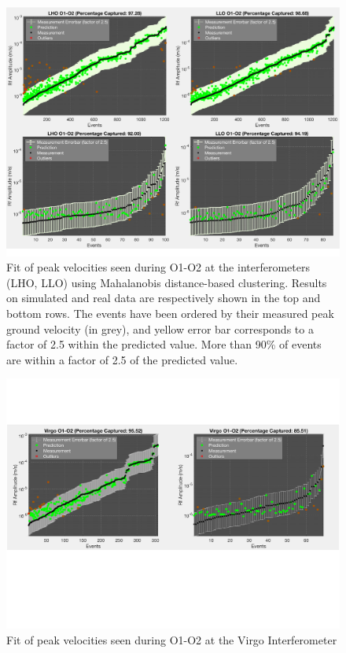 \documentclass[reprint, prl, aps, showpacs]{revtex4-1}
\begin{document}
\begin{figure}[!htb]
\hspace*{-0.5cm}
 \includegraphics[width=\textwidth]{./plots/ClusteringPrediction.pdf}
 \caption{Fit of peak velocities seen during O1-O2 at the interferometers (LHO, LLO) using Mahalanobis distance-based clustering. Results on simulated and real data are respectively shown in the top and bottom rows. The events have been ordered by their measured peak ground velocity (in grey), and yellow error bar corresponds to a factor of 2.5 within the predicted value. More than 90\% of events are within a factor of 2.5 of the predicted value.}
 \label{fig:regression}
\end{figure}

\begin{figure}[!htb]
\hspace*{-0.5cm}
 \includegraphics[width=\textwidth]{./plots/ClusteringPredictionVirgo.pdf}
 \caption{Fit of peak velocities seen during O1-O2 at the Virgo Interferometer}
 \label{fig:regression}
\end{figure}
\end{document}
